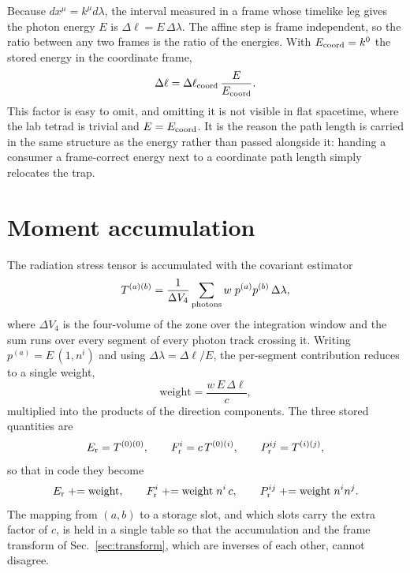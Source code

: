 \documentclass[11pt]{article}
\begin{document}
Because $dx^\mu = k^\mu d\lambda$, the interval measured in a frame whose timelike leg
gives the photon energy $E$ is $\Delta \ell = E \, \Delta\lambda$. The affine step is
frame independent, so the ratio between any two frames is the ratio of the energies. With
$E_{\rm coord} = k^0$ the stored energy in the coordinate frame,
\begin{equation}
  \Delta \ell = \Delta \ell_{\rm coord} \, \frac{E}{E_{\rm coord}} .
  \label{eq:dl}
\end{equation}
This factor is easy to omit, and omitting it is not visible in flat spacetime, where the
lab tetrad is trivial and $E = E_{\rm coord}$. It is the reason the path length is carried
in the same structure as the energy rather than passed alongside it: handing a consumer a
frame-correct energy next to a coordinate path length simply relocates the trap.

\section{Moment accumulation}

The radiation stress tensor is accumulated with the covariant estimator
\begin{equation}
  T^{(a)(b)} = \frac{1}{\Delta V_4} \sum_{\rm photons} w \; p^{(a)} p^{(b)} \, \Delta\lambda ,
  \label{eq:estimator}
\end{equation}
where $\Delta V_4$ is the four-volume of the zone over the integration window and the sum
runs over every segment of every photon track crossing it. Writing
$p^{(a)} = E\,(1, n^i)$ and using $\Delta\lambda = \Delta \ell / E$, the per-segment
contribution reduces to a single weight,
\begin{equation}
  \text{weight} = \frac{w \, E \, \Delta \ell}{c} ,
\end{equation}
multiplied into the products of the direction components. The three stored quantities are
\begin{equation}
  E_{\rm r} = T^{(0)(0)} , \qquad
  F_{\rm r}^{i} = c \, T^{(0)(i)} , \qquad
  P_{\rm r}^{ij} = T^{(i)(j)} ,
\end{equation}
so that in code they become
\begin{equation}
  E_{\rm r} \mathrel{+}= \text{weight} , \qquad
  F_{\rm r}^{i} \mathrel{+}= \text{weight} \; n^i \, c , \qquad
  P_{\rm r}^{ij} \mathrel{+}= \text{weight} \; n^i n^j .
\end{equation}
The mapping from $(a,b)$ to a storage slot, and which slots carry the extra factor of $c$,
is held in a single table so that the accumulation and the frame transform of
Sec.~\ref{sec:transform}, which are inverses of each other, cannot disagree.
\end{document}
